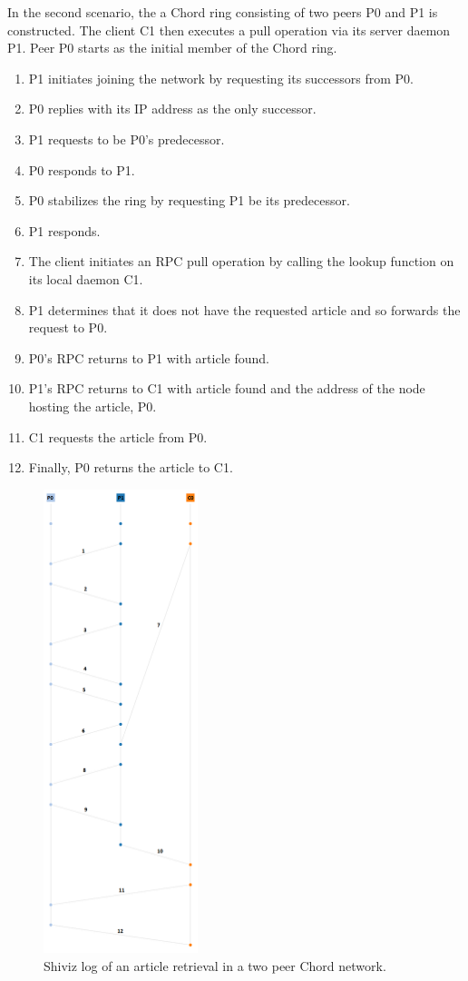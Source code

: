 \documentclass[twocolumn]{article}
\begin{document}
In the second scenario, the a Chord ring consisting of two peers P0 and P1 is constructed. The client C1 then executes a pull operation via its server daemon P1. Peer P0 starts as the initial member of the Chord ring.
\begin{enumerate}
  \item P1 initiates joining the network by requesting its successors from P0.
  \item P0 replies with its IP address as the only successor.
  \item P1 requests to be P0's predecessor.
  \item P0 responds to P1.
  \item P0 stabilizes the ring by requesting P1 be its predecessor.
  \item P1 responds.
  \item The client initiates an RPC pull operation by calling the lookup function on its local daemon C1.
  \item P1 determines that it does not have the requested article and so forwards the request to P0.
  \item P0's RPC returns to P1 with article found.
  \item P1's RPC returns to C1 with article found and the address of the node hosting the article, P0.
  \item C1 requests the article from P0.
  \item Finally, P0 returns the article to C1.
\end{enumerate}

\begin{figure}[tbh!]
  \centering
  \includegraphics[width=0.4\textwidth]{report/images/shiviz_article1}
  \caption{Shiviz log of an article retrieval in a two peer Chord network. \label{fig:shiviz_article}}
\end{figure}
\end{document}
